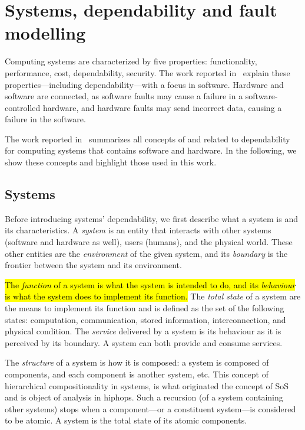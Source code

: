 \documentclass[12pt,openright,twoside,a4paper,oldfontcommands,english,brazil,draft]{abntex2}
\theoremstyle{theo}
\begin{document}
\section{Systems, dependability and fault modelling}
\label{sec:dependability}

\begin{sloppypar}
Computing systems are characterized by five properties: functionality, performance, cost, dependability, security.
The work reported in~\cite[p. 289--302]{Sommerville2011} explain these properties---including dependability---with a focus in software.
Hardware and software are connected, as software faults may cause a failure in a software-controlled hardware, and hardware faults may send incorrect data, causing a failure in the software.
\end{sloppypar}

The work reported in~\cite{ALR+2004} summarizes all concepts of and related to dependability for computing systems that contains software and hardware.
In the following, we show these concepts and highlight those used in this work.

\subsection{Systems}

Before introducing systems' dependability, we first describe what a system is and its characteristics.
A \emph{system} is an entity that interacts with other systems (software and hardware as well), users (humans), and the physical world.
These other entities are the \emph{environment} of the given system, and its \emph{boundary} is the frontier between the system and its environment.

\hl{The \emph{function} of a system is what the system is intended to do, and its \emph{behaviour} is what the system does to implement its function.} 
The \emph{total state} of a system are the means to implement its function and is defined as the set of the following states: computation, communication, stored information, interconnection, and physical condition.
The \emph{service} delivered by a system is its behaviour as it is perceived by its boundary.
A system can both provide and consume services.

The \emph{structure} of a system is how it is composed: a system is composed of components, and each component is another system, etc.
This concept of hierarchical compositionality in systems, is what originated the concept of \ac{SoS} and is object of analysis in \ac{hiphops}.
Such a recursion (of a system containing other systems) stops when a component---or a constituent system---is considered to be atomic.
A system is the total state of its atomic components.
\end{document}

